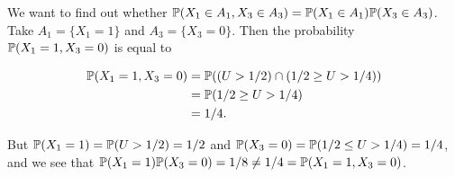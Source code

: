 
We want to find out whether $ \P(X_1 \in A_1, X_3\in A_3) = \P(X_1 \in A_1)\P(X_3 \in A_3 )$. 
Take $ A_1 = \{ X_1 = 1 \} $ and $ A_3 = \{ X_3 = 0 \} $. Then the probability $ \P(X_1 = 1, X_3 =
0)$ is equal to 

\begin{align*}
    \P(X_1 = 1, X_3 = 0	) &= \P( (U > 1/2) \cap (1/2 \geq U > 1/4))\\
			  &= \P(1/2 \geq U > 1/4)\\
			  &= 1/4.
\end{align*}

But $ \P(X_1 = 1) = \P( U > 1/2) = 1/2$ and $ \P( X_3 = 0) = \P(1/2 \leq U > 1/4) = 1/4$, and we see
that $ \P(X_1 = 1) \P(X_3 = 0) = 1/8 \neq 1/4 = \P(X_1=1, X_3=0)$.
